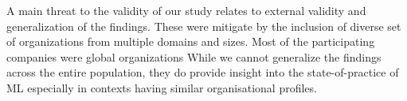 


A main threat to the validity of our study relates to external validity and generalization of the findings. These were mitigate by the inclusion of diverse set of organizations from multiple domains and sizes. Most of the participating companies were global organizations %
While we cannot generalize the findings across the entire population, they do provide insight into the state-of-practice of ML especially in contexts having similar organisational profiles. 










\DIFaddbegin \subsection{}


\subsection{} \DIFaddend